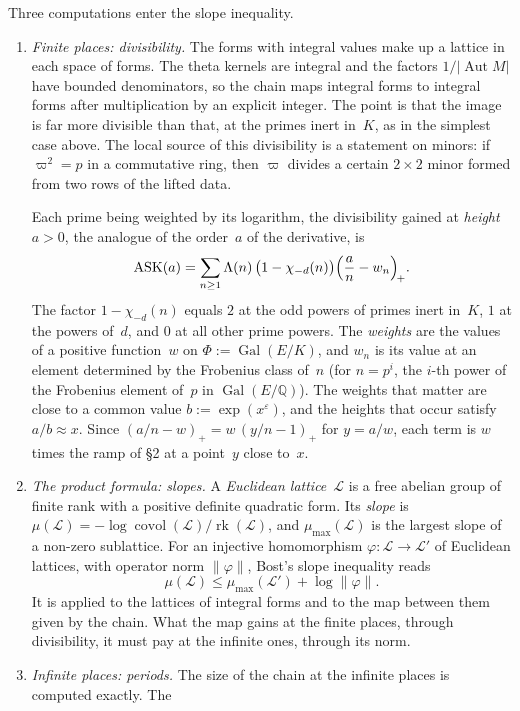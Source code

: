 \documentclass[11pt,a4paper]{article}
\newcommand{\eps}{\varepsilon}
\newcommand{\Q}{\mathbb{Q}}
\newcommand{\chid}{\chi_{-d}}
\newcommand{\Gal}{\operatorname{Gal}}
\newcommand{\kw}[1]{\emph{#1}}
\newcommand{\m}[1]{\mbox{$#1$}}        %
\begin{document}
Three computations enter the slope inequality.
\begin{enumerate}[label=\textit{(\alph*)}]
\item \kw{Finite places: divisibility.} The forms with integral values make up a lattice in each space of forms. The
theta kernels are integral and the factors $1/\lvert\operatorname{Aut}M\rvert$ have bounded denominators, so the
chain maps integral forms to integral forms after multiplication by an explicit integer. The point is that the image
is far more divisible than that, at the primes inert in~$K$, as in the simplest case above. The local source of this
divisibility is a statement on minors: if \m{\varpi^2=p} in a commutative ring, then $\varpi$ divides a certain
$2\times2$ minor formed from two rows of the lifted data.

Each prime being weighted by its logarithm, the divisibility gained at \kw{height} \m{a>0}, the analogue of the
order~$a$ of the derivative, is
\[
\mathrm{ASK}(a)=\sum_{n\ge1}\Lambda(n)\,\bigl(1-\chid(n)\bigr)\Bigl(\frac an-w_n\Bigr)_{\!+}.
\]
The factor $1-\chid(n)$ equals $2$ at the odd powers of primes inert in~$K$, $1$ at the powers of~$d$, and $0$ at all
other prime powers. The \kw{weights} are the values of a positive function~$w$ on $\Phi:=\Gal(E/K)$, and $w_n$ is its
value at an element determined by the Frobenius class of~$n$ (for \m{n=p^i}, the $i$-th power of the Frobenius
element of~$p$ in $\Gal(E/\Q)$). The weights that matter are close to a common value \m{b:=\exp(x^{\eps})}, and the heights that occur satisfy
\m{a/b\approx x}. Since \m{(a/n-w)_+=w\,(y/n-1)_+} for \m{y=a/w}, each term is $w$
times the ramp of §2 at a point~$y$ close to~$x$.
\item \kw{The product formula: slopes.} A \kw{Euclidean lattice}~$\mathcal L$ is a free abelian group of finite rank
with a positive definite quadratic form. Its \kw{slope} is
\m{\mu(\mathcal L)=-\log\operatorname{covol}(\mathcal L)/\operatorname{rk}(\mathcal L)}, and $\mu_{\max}(\mathcal L)$
is the largest slope of a non-zero sublattice. For an injective homomorphism
\m{\varphi\colon\mathcal L\to\mathcal L'} of Euclidean lattices, with operator norm $\lVert\varphi\rVert$, Bost's
slope inequality reads
\[
\mu(\mathcal L)\le\mu_{\max}(\mathcal L')+\log\lVert\varphi\rVert.
\]
It is applied to the lattices of integral forms and to the map between them given by the chain. What the map gains
at the finite places, through divisibility, it must pay at the infinite ones, through its norm.
\item \kw{Infinite places: periods.} The size of the chain at the infinite places is computed exactly. The

\end{enumerate}
\end{document}
